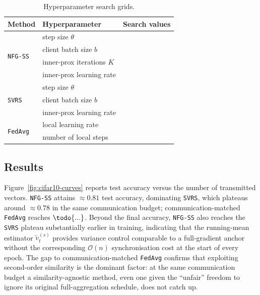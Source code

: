 \begin{table}[t]
\centering
\caption{Hyperparameter search grids.}
\label{tab:hyper-grid}
\begin{tabular}{lll}
\toprule
Method & Hyperparameter & Search values \\
\midrule
\multirow{4}{*}{\texttt{NFG-SS}}
  & step size $\theta$           & \todo{...} \\
  & client batch size $b$        & \todo{...} \\
  & inner-prox iterations $K$    & \todo{...} \\
  & inner-prox learning rate     & \todo{...} \\
\midrule
\multirow{3}{*}{\texttt{SVRS}}
  & step size $\theta$           & \todo{...} \\
  & client batch size $b$        & \todo{...} \\
  & inner-prox learning rate     & \todo{...} \\
\midrule
\multirow{2}{*}{\texttt{FedAvg}}
  & local learning rate          & \todo{...} \\
  & number of local steps        & \todo{...} \\
\bottomrule
\end{tabular}
\end{table}

\subsection{Results}
\label{sec:exp-results}

Figure~\ref{fig:cifar10-curves} reports test accuracy versus the
number of transmitted vectors. \texttt{NFG-SS} attains $\approx 0.81$
test accuracy, dominating \texttt{SVRS}, which plateaus around
$\approx 0.78$ in the same communication budget;
communication-matched \texttt{FedAvg} reaches $\todo{...}$. Beyond the
final accuracy, \texttt{NFG-SS} also reaches the \texttt{SVRS}
plateau substantially earlier in training, indicating that the
running-mean estimator $\tilde v_t^{(s)}$ provides variance control
comparable to a full-gradient anchor without the corresponding
$\mathcal{O}(n)$ synchronisation cost at the start of every epoch.
The gap to communication-matched \texttt{FedAvg} confirms that
exploiting second-order similarity is the dominant factor: at the
same communication budget a similarity-agnostic method, even one
given the ``unfair'' freedom to ignore its original full-aggregation
schedule, does not catch up.

